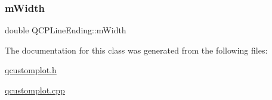 \subsubsection{\texorpdfstring{m\+Width}{mWidth}}
{\footnotesize\ttfamily double Q\+C\+P\+Line\+Ending\+::m\+Width\hspace{0.3cm}{\ttfamily [protected]}}



The documentation for this class was generated from the following files\+:\begin{DoxyCompactItemize}
\item 
\hyperlink{qcustomplot_8h}{qcustomplot.\+h}\item 
\hyperlink{qcustomplot_8cpp}{qcustomplot.\+cpp}\end{DoxyCompactItemize}
